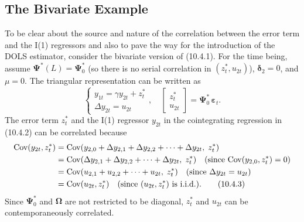 \subsection*{The Bivariate Example}

To be clear about the source and nature of the correlation between the error term
and the I(1) regressors and also to pave the way for the introduction of the DOLS
estimator, consider the bivariate version of (10.4.1). For the time being, assume
$\boldsymbol{\Psi}^*(L) = \boldsymbol{\Psi}_0^*$ (so there is no serial correlation in $(z_t^*, u_{2t})$),
$\boldsymbol{\delta}_2 = 0$, and $\mu = 0$. The
triangular representation can be written as
\begin{equation}
  \begin{cases}
    y_{1t} = \gamma y_{2t} + z_t^* \\
    \Delta y_{2t} = u_{2t}
  \end{cases}, \quad
  \begin{bmatrix} z_t^* \\ u_{2t} \end{bmatrix}
  = \boldsymbol{\Psi}_0^* \, \boldsymbol{\varepsilon}_t.
  \label{eq:10.4.2} \tag{10.4.2}
\end{equation}
The error term $z_t^*$ and the I(1) regressor $y_{2t}$ in the cointegrating regression in
(10.4.2) can be correlated because
\begin{align}
  \text{Cov}(y_{2t}, z_t^*)
  &= \text{Cov}(y_{2,0} + \Delta y_{2,1} + \Delta y_{2,2} + \cdots + \Delta y_{2t},\; z_t^*)
  \notag \\
  &= \text{Cov}(\Delta y_{2,1} + \Delta y_{2,2} + \cdots + \Delta y_{2t},\; z_t^*)
    \quad (\text{since } \text{Cov}(y_{2,0}, z_t^*) = 0)
  \notag \\
  &= \text{Cov}(u_{2,1} + u_{2,2} + \cdots + u_{2t},\; z_t^*)
    \quad (\text{since } \Delta y_{2t} = u_{2t})
  \notag \\
  &= \text{Cov}(u_{2t}, z_t^*)
    \quad (\text{since } (u_{2t}, z_t^*) \text{ is i.i.d.}).
  \label{eq:10.4.3} \tag{10.4.3}
\end{align}
Since $\boldsymbol{\Psi}_0^*$ and $\boldsymbol{\Omega}$ are not restricted to be diagonal, $z_t^*$ and $u_{2t}$ can be contemporane\-ously
correlated.

